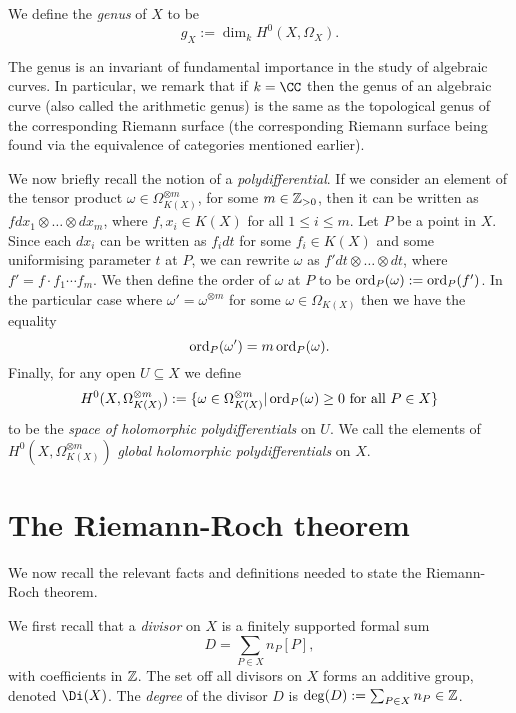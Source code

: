     \begin{defn}\label{definitiongenus}
    We define the \emph{genus} of $X$ to be
        \[
        g_X := \dim_k H^0(X,\Omega_X).
        \]
    \end{defn}

The genus is an invariant of fundamental importance in the study of algebraic curves.
In particular, we remark that if $k = \CC$ then the genus of an algebraic curve (also called the arithmetic genus) is the same as the topological genus of the corresponding Riemann surface (the corresponding Riemann surface being found via the equivalence of categories mentioned earlier).

We now briefly recall the notion of a \emph{polydifferential}.
If we consider an element of the tensor product $\omega \in \Omega_{K(X)}^{\otimes m}$, for some $m \in {\mathbb Z}_{>0}$, then it can be written as $f dx_1\otimes \ldots \otimes dx_m$, where $f, x_i \in K(X)$ for all $1 \leq i \leq m$.
Let $P$ be a point in $X$.
Since each $dx_i$ can be written as $f_i dt$ for some $f_i\in K(X)$ and some uniformising parameter $t$ at $P$, we can rewrite $\omega$ as $f' dt \otimes \ldots \otimes dt$, where $f' = f \cdot f_1 \cdots f_m$.
We then define the order of $\omega$ at $P$ to be $\operatorname{ord}_P(\omega ) := \operatorname{ord}_P(f')$.
In the particular case where $\omega' = \omega^{\otimes m}$ for some $\omega \in \Omega_{K(X)}$ then we have the equality
    \[ 
    \operatorname{ord}_P(\omega') = m\operatorname{ord}_P(\omega).
    \]
Finally, for any open $U \subseteq X$ we define 
    \[
    H^0(X,\Omega_{K(X)}^{\otimes m}):= \{\omega \in \Omega_{K(X)}^{\otimes m} | \ord_P(\omega) \geq 0 \ \text{for all}\ P \in X\}
    \]
to be the \emph{space of holomorphic polydifferentials} on $U$.
We call the elements of $H^0(X,\Omega_{K(X)}^{\otimes m})$ \emph{global holomorphic polydifferentials} on $X$.


\section{The Riemann-Roch theorem}

We now recall the relevant facts and definitions needed to state the Riemann-Roch theorem.

We first recall that a \emph{divisor} on $X$ is a finitely supported formal sum 
    \[
    D = \sum_{P \in X} n_P[P],
    \]
with coefficients in ${\mathbb Z}$.
The set off all divisors on $X$ forms an additive group, denoted $\Di (X)$.
The \emph{degree} of the divisor $D$ is $\deg(D) := \sum_{P \in X} n_P \in {\mathbb Z}$.


